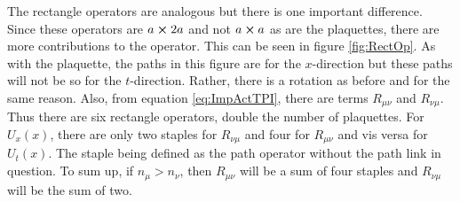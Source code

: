 \documentclass[11pt]{article}
\begin{document}
The rectangle operators are analogous but there is one important difference. Since these operators are $a\cross2a$ and not $a\cross a$ as are the plaquettes, there are more contributions to the operator. This can be seen in figure \ref{fig:RectOp}. As with the plaquette, the paths in this figure are for the $x$-direction but these paths will not be so for the $t$-direction. Rather, there is a rotation as before and for the same reason. Also, from equation \ref{eq:ImpActTPI}, there are terms $R_{\mu\nu}$ and $R_{\nu\mu}$. Thus there are six rectangle operators, double the number of plaquettes. For $U_x(x)$, there are only two staples for $R_{\nu\mu}$ and four for $R_{\mu\nu}$ and vis versa for $U_t(x)$. The staple being defined as the path operator without the path link in question. To sum up, if $n_\mu>n_\nu$, then $R_{\mu\nu}$ will be a sum of four staples and $R_{\nu\mu}$ will be the sum of two.
\end{document}
